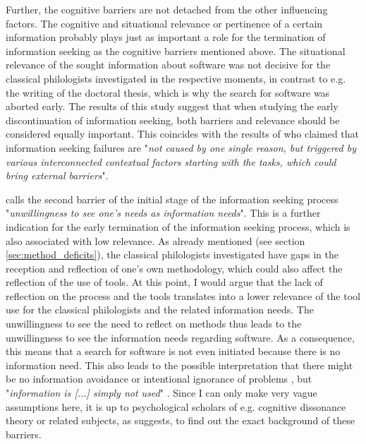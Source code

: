 \documentclass[12pt, a4paper, titlepage, oneside, abstract=true, toc=listof, toc=bibliography, BCOR=1cm]{scrreprt}
\begin{document}
{Further, the cognitive barriers are not detached from the other influencing factors. The cognitive and situational relevance \citep{Schamber1990} or pertinence \citep{Froehlich1994} of a certain information probably plays just as important a role for the termination of information seeking as the cognitive barriers mentioned above. The situational relevance of the sought information about software was not decisive for the classical philologists investigated in the respective moments, in contrast to e.g. the writing of the doctoral thesis, which is why the search for software was aborted early. The results of this study suggest that when studying the early discontinuation of information seeking, both barriers and relevance should be considered equally important. This coincides with the results of \citet[p. 454]{Wang2008} who claimed that information seeking failures are "\textit{not caused by one single reason, but triggered by various interconnected contextual factors starting with the tasks, which could bring external barriers}".  

\citet[p. 616]{Savolainen2015a} calls the second barrier of the initial stage of the information seeking process "\textit{unwillingness to see one's needs as information needs}". This is a further indication for the early termination of the information seeking process, which is also associated with low relevance. As already mentioned (see section \ref{sec:method_deficits}), the classical philologists investigated have gaps in the reception and reflection of one's own methodology, which could also affect the reflection of the use of tools. At this point, I would argue that the lack of reflection on the process and the tools translates into a lower relevance of the tool use for the classical philologists and the related information needs. The unwillingness to see the need to reflect on methods thus leads to the unwillingness to see the information needs regarding software. As a consequence, this means that a search for software is not even initiated because there is no information need. This also leads to the possible interpretation that there might be no information avoidance \citep[p. 97ff]{Case2007a} or intentional ignorance of problems \citep[p. 616]{Savolainen2015a}, but "\textit{information is [...] simply not used}" \citep[p. 100]{Case2007a}. Since I can only make very vague assumptions here, it is up to psychological scholars of e.g. cognitive dissonance theory \citep{Festinger1957} or related subjects, as \citet[p. 616]{Savolainen2015a} suggests, to find out the exact background of these barriers.

}
\end{document}
